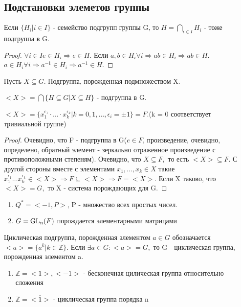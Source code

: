 \subsection{Подстановки элеметов группы}
\begin{lemma}
	Если \(\{H_i|i\in I\}\) - семейство подгрупп группы G, то \(H = \bigcap_{i\in I}H_i\) - тоже подгруппа в G.
\end{lemma}
\begin{proof}
	\(\forall i\in I e\in H_i \Longrightarrow e\in H\). Если \(a,b \in H_i \forall i \Longrightarrow ab\in H_i \Longrightarrow ab\in H\). \(a\in H_i \forall i \Longrightarrow a^{-1}\in H_i\Longrightarrow a^{-1}\in H\).
\end{proof}
\begin{definition}
	Пусть \(X\subseteq G\). Подгруппа, порожденная подмножеством X. 
	
	\(<X> = \bigcap \{H\subseteq G|X\subseteq H\}\) - подгруппа в G.
\end{definition}
\begin{theorem}
	\(<X> = \{x_1^{\epsilon_1}\cdot\ldots\cdot x_k^{\epsilon_k}| k = 0, 1, \ldots, \epsilon_i = \pm 1\} = F\).(k = 0 соответствует тривиальной группе)
\end{theorem}
\begin{proof}
	Очевидно, что F - подгруппа в G(\(e\in F\), произведение, очевидно, определено, обратный элемент - зеркально отраженное произведение с противоположными степеням). Очевидно, что \(X\subseteq F,\) то есть \(<X>\subseteq F\). С другой стороны вместе с элементами \(x_1, \ldots, x_k\in X\) такие \(x_1^{\epsilon_1}\ldots x_k^{\epsilon_k}\in <X> \Longrightarrow F\subseteq <X> \Longrightarrow F = <X>\). Если X таково, что \(<X> = G,\) то X - система порождающих для G.
\end{proof}
\begin{example}
	\begin{enumerate}
		\item \(Q^* = <-1, P>\), P - множество всех простых чисел.
		\item \(G = \operatorname{GL}_n(F)\) порождается элементарными матрицами
	\end{enumerate}
\end{example}
\begin{definition}
	Циклическая подгруппа, порожденная элементом \(a\in G\) обозначается \(<a> = \{a^k|k\in\mathbb{Z}\}\). Если \(\exists a\in G: <a> = G,\) то G - циклическая группа, порожденная элементом a.
\end{definition}
\begin{example}
	\begin{enumerate}
		\item \(\mathbb{Z} = <1>, <-1> \) - бесконечная цилическая группа относительно сложения 
		\item \(\mathbb{Z} = <\overline 1>\) - циклическая группа порядка n
	\end{enumerate}
\end{example}
